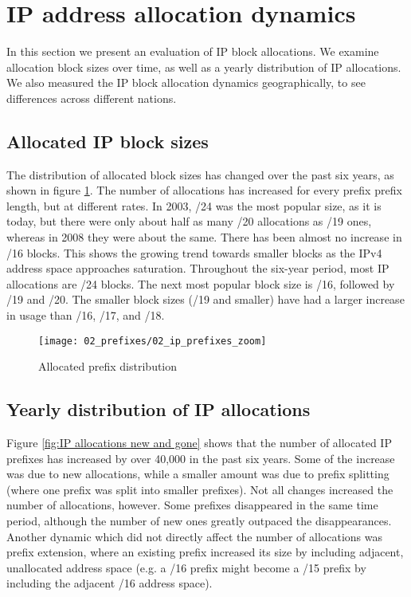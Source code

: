 \section{IP address allocation dynamics}
\label{sec:allocations}

In this section we present an evaluation of IP block allocations. We examine 
allocation block sizes over time, as well as a yearly distribution of IP 
allocations. We also measured the IP block allocation dynamics geographically,
to see differences across different nations.

\subsection{Allocated IP block sizes}

The distribution of allocated block sizes has changed over the past six years,
as shown in figure \ref{fig:IP allocations}. The number of allocations has
increased for every prefix prefix length, but at different rates. In 2003, /24
was the most popular size, as it is today, but there were only about half as
many /20 allocations as /19 ones, whereas in 2008 they were about the same.
There has been almost no increase in /16 blocks. This shows the growing trend
towards smaller blocks as the IPv4 address space approaches saturation.
Throughout the six-year period, most IP allocations are /24 blocks. The next
most popular block size is /16, followed by /19 and /20. The smaller block
sizes (/19 and smaller) have had a larger increase in usage than /16, /17, and
/18.

\begin{figure}[htbp]
 	\centering
 		\texttt{[image: 02\_prefixes/02\_ip\_prefixes\_zoom]}
	\caption{Allocated prefix distribution}
 	\label{fig:IP allocations}
\end{figure}

\subsection{Yearly distribution of IP allocations}


Figure \ref{fig:IP allocations new and gone} shows that the number of
allocated IP prefixes has increased by over 40,000 in the past six years. Some
of the increase was due to new allocations, while a smaller amount was due to
prefix splitting (where one prefix was split into smaller prefixes). Not all
changes increased the number of allocations, however. Some prefixes
disappeared in the same time period, although the number of new ones greatly
outpaced the disappearances. Another dynamic which did not directly affect the
number of allocations was prefix extension, where an existing prefix increased
its size by including adjacent, unallocated address space (e.g. a /16 prefix
might become a /15 prefix by including the adjacent /16 address space).

